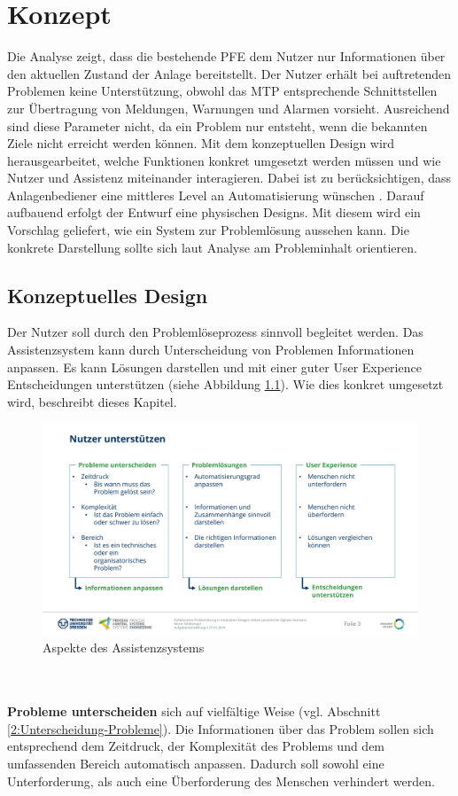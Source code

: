 \chapter{Konzept}
\label{sec:Konzept}
Die Analyse zeigt, dass die bestehende PFE dem Nutzer nur Informationen über den aktuellen Zustand der Anlage bereitstellt. Der Nutzer erhält bei auftretenden Problemen keine Unterstützung, obwohl das MTP entsprechende Schnittstellen zur Übertragung von Meldungen, Warnungen und Alarmen vorsieht. Ausreichend sind diese Parameter nicht, da ein Problem nur entsteht, wenn die bekannten Ziele nicht erreicht werden können. Mit dem konzeptuellen Design wird herausgearbeitet, welche Funktionen konkret umgesetzt werden müssen und wie Nutzer und Assistenz miteinander interagieren. Dabei ist zu berücksichtigen, dass Anlagenbediener eine mittleres Level an Automatisierung wünschen . Darauf aufbauend erfolgt der Entwurf eine physischen Designs. Mit diesem wird ein Vorschlag geliefert, wie ein System zur Problemlösung aussehen kann. Die konkrete Darstellung sollte sich laut Analyse am Probleminhalt orientieren.

\section{Konzeptuelles Design}
Der Nutzer soll durch den Problemlöseprozess sinnvoll begleitet werden. Das Assistenzsystem kann durch Unterscheidung von Problemen Informationen anpassen. Es kann Lösungen darstellen und mit einer guter User Experience Entscheidungen unterstützen (siehe Abbildung \ref{pic:Nutzer-Unterstuetzen}). Wie dies konkret umgesetzt wird, beschreibt dieses Kapitel.
\begin{figure}[h!]
\centering
\includegraphics[scale=0.43]{DA_files/Bilder/Konzept/Nutzer-unterstuetzen.pdf}
\caption{Aspekte des Assistenzsystems}
\label{pic:Nutzer-Unterstuetzen}
\end{figure}
\\ \\
\textbf{Probleme unterscheiden} sich auf vielfältige Weise (vgl. Abschnitt \ref{2:Unterscheidung-Probleme}). Die Informationen über das Problem sollen sich entsprechend dem Zeitdruck, der Komplexität des Problems und dem umfassenden Bereich automatisch anpassen. Dadurch soll sowohl eine Unterforderung, als auch eine Überforderung des Menschen verhindert werden.

